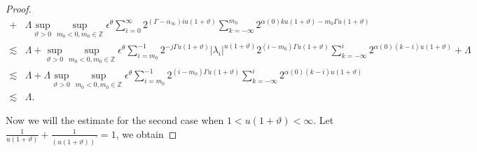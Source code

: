 \documentclass[10pt,a4paper]{amsart}
\begin{document}
\begin{proof}
\begin{align*}
+ & \Lambda  \sup_{\vartheta>0 }\sup _{m_0<0  , m_0\in  \mathbb{Z}} \epsilon  ^\theta \sum_{i=0}^{\infty} 2^{\left(\Gamma-\alpha_{\infty}\right) iu (1+\vartheta)}  \sum_{k=-\infty}^{m_0} 2^{\alpha(0) k u(1+\vartheta)-m_0\Gamma u(1+\vartheta)}\\
\lesssim & \Lambda +\sup_{\vartheta>0 }\sup _{m_0<0, m_0\in  \mathbb{Z}}  \epsilon  ^\theta \sum_{i=m_0}^{-1}2^{-j\Gamma u(1+\vartheta)}\left|\lambda_{i}\right|^{u(1+\vartheta)} 2^{(i-m_0) \Gamma u(1+\vartheta)}\sum_{k=-\infty}^{i} 2^{\alpha(0)(k-i) u(1+\vartheta)}  + \Lambda \\
\lesssim & \Lambda + \Lambda \sup_{\vartheta>0 }\sup _{m_0<0, m_0\in  \mathbb{Z}}  \epsilon  ^\theta \sum_{i=m_0}^{-1} 2^{(i-m_0) \Gamma u(1+\vartheta)}\sum_{k=-\infty}^{i} 2^{\alpha(0)(k-i) u(1+\vartheta)}\\
\lesssim & \Lambda.
\end{align*}




Now we will the estimate for the second case when $1<u(1+\vartheta)<\infty$. Let $\frac{1}{u(1+\vartheta)}+ \frac{1}{(u(1+\vartheta))^\prime}=1$,  we obtain


\end{proof}
\end{document}
